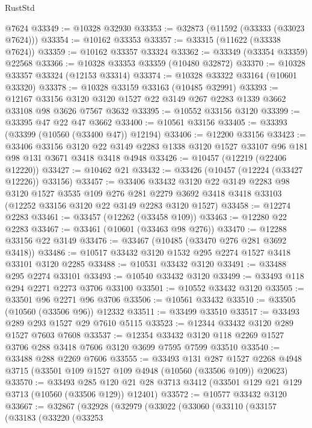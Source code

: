 \begin{lexlean}{RustStd}
\begin{coremodule}
    @7624
@33349 := @10328 @32930
@33353 := @32873 (@11592 (@33333 (@33023 @7624)))
@33354 := @10162 @33353
@33357 := @33315 (@11622 (@33338 @7624))
@33359 := @10162 @33357 @33324
@33362 := @33349 (@33354 @33359) @22568
@33366 := @10328 @33353 @33359 (@10480 @32872)
@33370 := @10328 @33357 @33324 (@12153 @33314)
@33374 := @10328 @33322 @33164 (@10601 @33320)
@33378 := @10328 @33159 @33163 (@10485 @32991)
@33393 := @12167
    @33156
    @3120
    @3120
    @1527
    @22
    @3149
    @267
    @2283
    @1339
    @3662
    @33108
    @98
    @3626
    @7567
    @3632
@33395 := @10552 @33156 @3120
@33399 := @33395 @47 @22 @47 @3662
@33400 := @10561 @33156
@33405 := @33393 (@33399 (@10560 (@33400 @47)) @12194)
@33406 := @12200 @33156
@33423 := @33406
    @33156
    @3120
    @22
    @3149
    @2283
    @1338
    @3120
    @1527
    @33107
    @96
    @181
    @98
    @131
    @3671
    @3418
    @3418
    @4948
@33426 := @10457 (@12219 (@22406 @12220))
@33427 := @10462 @21
@33432 := @33426 (@10457 (@12224 (@33427 @12226)) @33156)
@33457 := @33406
    @33432
    @3120
    @22
    @3149
    @2283
    @98
    @3120
    @1527
    @3535
    @109
    @276
    @281
    @2279
    @3692
    @3418
    @3418
    @33103
    (@12252 @33156 @3120 @22 @3149 @2283 @3120 @1527)
@33458 := @12274 @2283
@33461 := @33457 (@12262 (@33458 @109))
@33463 := @12280 @22 @2283
@33467 := @33461 (@10601 (@33463 @98 @276))
@33470 := @12288 @33156 @22 @3149
@33476 := @33467 (@10485 (@33470 @276 @281 @3692 @3418))
@33486 := @10517 @33432 @3120 @1532 @295 @2274 @1527 @3418 @33101 @3120 @2285
@33488 := @10531 @33432 @3120
@33491 := @33488 @295 @2274 @33101
@33493 := @10540 @33432 @3120
@33499 := @33493 @118 @294 @2271 @2273 @3706 @33100
@33501 := @10552 @33432 @3120
@33505 := @33501 @96 @2271 @96 @3706
@33506 := @10561 @33432
@33510 := @33505 (@10560 (@33506 @96)) @12332
@33511 := @33499 @33510
@33517 := @33493 @289 @293 @1527 @29 @7610 @5115
@33523 := @12344 @33432 @3120 @289 @1527 @7603 @7608
@33537 := @12354 @33432 @3120 @118 @2269 @1527 @3706 @288 @3418 @7606 @3120 @3699 @7595 @7599 @33510
@33540 := @33488 @288 @2269 @7606
@33555 := @33493
    @131
    @287
    @1527
    @2268
    @4948
    @3715
    (@33501 @109 @1527 @109 @4948 (@10560 (@33506 @109)) @20623)
@33570 := @33493
    @285
    @120
    @21
    @28
    @3713
    @3412
    (@33501 @129 @21 @129 @3713 (@10560 (@33506 @129)) @12401)
@33572 := @10577 @33432 @3120
@33667 := @32867
    (@32928
      (@32979
        (@33022
          (@33060
            (@33110
              (@33157
                (@33183
                  (@33220
                    (@33253

\end{coremodule}
\end{lexlean}
